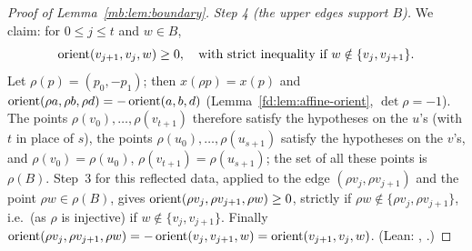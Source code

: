 \begin{proof}[Proof of Lemma~\ref{mb:lem:boundary}]
\emph{Step 4 (the upper edges support $B$).} We claim: for $0\le j\le t$ and $w\in B$,
\begin{equation}\label{mb:eq:upper-edge}
\operatorname{orient}(v_{j+1},v_j,w)\ge0,\quad\text{with strict inequality if } w\notin\{v_j,v_{j+1}\}.
\end{equation}
Let $\rho(p)=(p_0,-p_1)$; then $x(\rho p)=x(p)$ and $\operatorname{orient}(\rho a,\rho b,\rho d)=-\operatorname{orient}(a,b,d)$
(Lemma~\ref{fd:lem:affine-orient}, $\det\rho=-1$). The points $\rho(v_0),\dots,\rho(v_{t+1})$ therefore satisfy the
hypotheses on the $u$'s (with $t$ in place of $s$), the points $\rho(u_0),\dots,\rho(u_{s+1})$ satisfy the hypotheses on
the $v$'s, and $\rho(v_0)=\rho(u_0)$, $\rho(v_{t+1})=\rho(u_{s+1})$; the set of all these points is $\rho(B)$. Step~3 for
this reflected data, applied to the edge $(\rho v_j,\rho v_{j+1})$ and the point $\rho w\in\rho(B)$, gives
$\operatorname{orient}(\rho v_j,\rho v_{j+1},\rho w)\ge0$, strictly if $\rho w\notin\{\rho v_j,\rho v_{j+1}\}$, i.e.\ (as $\rho$ is
injective) if $w\notin\{v_j,v_{j+1}\}$. Finally
$\operatorname{orient}(\rho v_j,\rho v_{j+1},\rho w)=-\operatorname{orient}(v_j,v_{j+1},w)=\operatorname{orient}(v_{j+1},v_j,w)$. (Lean: ,
.)


\end{proof}
